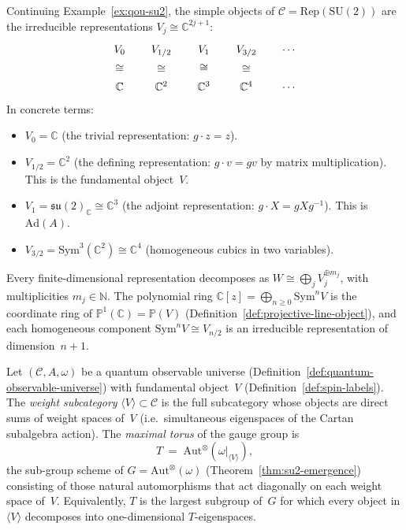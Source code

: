 \begin{example}
\label{ex:spin-labels-su2}
Continuing Example~\ref{ex:qou-su2}, the simple objects of
$\mathcal{C} = \mathrm{Rep}(\mathrm{SU}(2))$ are the irreducible
representations $V_j \cong \mathbb{C}^{2j+1}$:
\begin{equation}\label{eq:spin-decomposition}
\begin{tikzcd}[row sep=1.5em, column sep=1.5em]
  V_0 \ar[d, phantom, "\cong"] & V_{1/2} \ar[d, phantom, "\cong"]
    & V_1 \ar[d, phantom, "\cong"] & V_{3/2} \ar[d, phantom, "\cong"]
    & \cdots \\
  \mathbb{C} & \mathbb{C}^2 & \mathbb{C}^3 & \mathbb{C}^4 & \cdots
\end{tikzcd}
\end{equation}
In concrete terms:
\begin{itemize}
  \item $V_0 = \mathbb{C}$ (the trivial representation: $g \cdot z = z$).
  \item $V_{1/2} = \mathbb{C}^2$ (the defining representation:
        $g \cdot v = gv$ by matrix multiplication).  This is the
        fundamental object~$V$.
  \item $V_1 = \mathfrak{su}(2)_{\mathbb{C}} \cong \mathbb{C}^3$
        (the adjoint representation: $g \cdot X = gXg^{-1}$).  This is
        $\mathrm{Ad}(A)$.
  \item $V_{3/2} = \mathrm{Sym}^3(\mathbb{C}^2) \cong \mathbb{C}^4$
        (homogeneous cubics in two variables).
\end{itemize}
Every finite-dimensional representation decomposes as
$W \cong \bigoplus_j V_j^{\oplus m_j}$, with multiplicities
$m_j \in \mathbb{N}$.  The polynomial ring
$\mathbb{C}[z] = \bigoplus_{n \geq 0} \mathrm{Sym}^n V$ is the
coordinate ring of $\mathbb{P}^1(\mathbb{C}) = \mathbb{P}(V)$
(Definition~\ref{def:projective-line-object}), and each homogeneous
component $\mathrm{Sym}^n V \cong V_{n/2}$ is an irreducible
representation of dimension~$n + 1$.
\end{example}

\begin{definition}
\label{def:maximal-torus}
Let $(\mathcal{C}, A, \omega)$ be a quantum observable universe
(Definition~\ref{def:quantum-observable-universe}) with fundamental
object~$V$ (Definition~\ref{def:spin-labels}).  The \emph{weight
subcategory} $\langle V \rangle \subset \mathcal{C}$ is the full
subcategory whose objects are direct sums of weight spaces of~$V$
(i.e.\ simultaneous eigenspaces of the Cartan subalgebra action).
The \emph{maximal torus} of the gauge group is
\[
  T \;=\; \mathrm{Aut}^{\otimes}(\omega|_{\langle V \rangle}),
\]
the sub-group scheme of
$G = \mathrm{Aut}^{\otimes}(\omega)$
(Theorem~\ref{thm:su2-emergence}) consisting of those natural
automorphisms that act diagonally on each weight space of~$V$.
Equivalently, $T$ is the largest subgroup of~$G$ for which every
object in $\langle V \rangle$ decomposes into one-dimensional
$T$-eigenspaces.
\end{definition}

